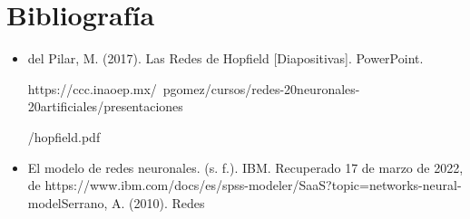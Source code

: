 \documentclass[12pt]{article}
\begin{document}
\section{Bibliografía}
\begin{itemize}
    \item del Pilar, M. (2017). Las Redes de Hopfield [Diapositivas]. PowerPoint. 
    
    https://ccc.inaoep.mx/~pgomez/cursos/redes-20neuronales-20artificiales/presentaciones
    
    /hopfield.pdf
    
    \item El modelo de redes neuronales. (s. f.). IBM. Recuperado 17 de marzo de 2022, de https://www.ibm.com/docs/es/spss-modeler/SaaS?topic=networks-neural-
    modelSerrano, A. (2010). Redes 
\end{itemize}
\end{document}
